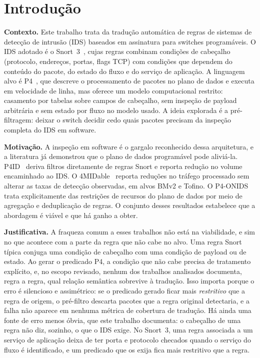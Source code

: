 \documentclass[conference]{IEEEtran}
\begin{document}
\section{Introdução}

\textbf{Contexto.} Este trabalho trata da tradução automática de regras de
sistemas de detecção de intrusão (IDS) baseados em assinatura para switches
programáveis. O IDS adotado é o Snort~3~\cite{roesch1999snort,snort3manual},
cujas regras combinam condições de cabeçalho (protocolo, endereços, portas,
flags TCP) com condições que dependem do conteúdo do pacote, do estado do
fluxo e do serviço de aplicação. A linguagem alvo é P4~\cite{bosshart2014p4},
que descreve o processamento de pacotes no plano de dados e executa em
velocidade de linha, mas oferece um modelo computacional restrito: casamento
por tabelas sobre campos de cabeçalho, sem inspeção de payload arbitrária e
sem estado por fluxo no modelo usado. A ideia explorada é a pré-filtragem:
deixar o switch decidir cedo quais pacotes precisam da inspeção completa do
IDS em software.

\textbf{Motivação.} A inspeção em software é o gargalo reconhecido dessa
arquitetura, e a literatura já demonstrou que o plano de dados programável
pode aliviá-la. P4ID~\cite{lewis2019p4id} deriva filtros diretamente de
regras Snort e reporta redução no volume encaminhado ao IDS. O
4MIDable~\cite{lewis2023fourmidable} reporta reduções no tráfego processado
sem alterar as taxas de detecção observadas, em alvos BMv2 e Tofino. O
P4-ONIDS~\cite{tavares2021p4onids} trata explicitamente das restrições de
recursos do plano de dados por meio de agregação e deduplicação de regras. O
conjunto desses resultados estabelece que a abordagem é viável e que há ganho
a obter.

\textbf{Justificativa.} A fraqueza comum a esses trabalhos não está na
viabilidade, e sim no que acontece com a parte da regra que não cabe no alvo.
Uma regra Snort típica conjuga uma condição de cabeçalho com uma condição de
payload ou de estado. Ao gerar o predicado P4, a condição que não cabe precisa
de tratamento explícito, e, no escopo revisado, nenhum dos trabalhos
analisados documenta, regra a regra, qual relação semântica sobrevive à
tradução. Isso importa porque o erro é silencioso e assimétrico: se o
predicado gerado ficar mais \emph{restritivo} que a regra de origem, o
pré-filtro descarta pacotes que a regra original detectaria, e a falha não
aparece em nenhuma métrica de cobertura de tradução. Há ainda uma fonte de
erro menos óbvia, que este trabalho documenta: o cabeçalho de uma regra não
diz, sozinho, o que o IDS exige. No Snort~3, uma regra associada a um serviço
de aplicação deixa de ter porta e protocolo checados quando o serviço do fluxo
é identificado, e um predicado que os exija fica mais restritivo que a regra.
\end{document}
